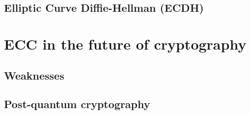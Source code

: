 \documentclass[a4paper]{article}
\begin{document}
\subsection{Elliptic Curve Diffie-Hellman (ECDH)}


\section{ECC in the future of cryptography}

\subsection{Weaknesses}

\subsection{Post-quantum cryptography}


\newpage


\end{document}

